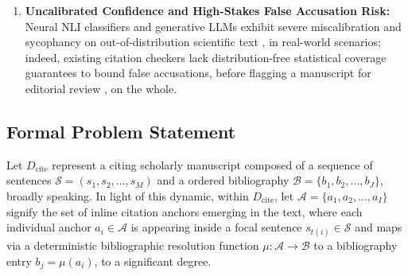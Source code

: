 \documentclass[journal]{IEEEtran}
\begin{document}
\begin{enumerate}
\item \textbf{Uncalibrated Confidence and High-Stakes False Accusation Risk:} Neural NLI classifiers and generative LLMs exhibit severe miscalibration and sycophancy on out-of-distribution scientific text \cite{liu2024lost,angelopoulos2023conformal}, in real-world scenarios; indeed, existing citation checkers lack distribution-free statistical coverage guarantees to bound false accusations, before flagging a manuscript for editorial review \cite{sadinle2019least}, on the whole.
\end{enumerate}

\subsection{Formal Problem Statement}
Let $D_{\text{cite}}$ represent a citing scholarly manuscript composed of a sequence of sentences $\mathcal{S} = (s_1, s_2, \dots, s_M)$ and a ordered bibliography $\mathcal{B} = \{b_1, b_2, \dots, b_J\}$, broadly speaking. In light of this dynamic, within $D_{\text{cite}}$, let $\mathcal{A} = \{a_1, a_2, \dots, a_I\}$ signify the set of inline citation anchors emerging in the text, where each individual anchor $a_i \in \mathcal{A}$ is appearing inside a focal sentence $s_{t(i)} \in \mathcal{S}$ and maps via a deterministic bibliographic resolution function $\mu: \mathcal{A} \to \mathcal{B}$ to a bibliography entry $b_j = \mu(a_i)$, to a significant degree.
\end{document}
